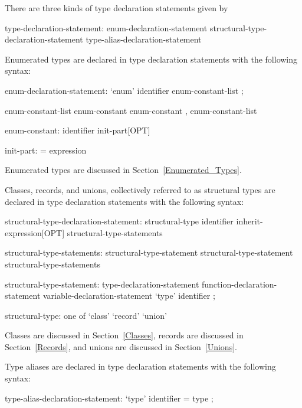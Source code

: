 There are three kinds of type declaration statements given by
\begin{syntax}
type-declaration-statement:
  enum-declaration-statement
  structural-type-declaration-statement
  type-alias-declaration-statement
\end{syntax}

Enumerated types are declared in type declaration statements with the
following syntax:
\begin{syntax}
enum-declaration-statement:
  `enum' identifier { enum-constant-list } ;

enum-constant-list
  enum-constant
  enum-constant , enum-constant-list

enum-constant:
  identifier init-part[OPT]

init-part:
  = expression
\end{syntax}
Enumerated types are discussed in Section~\ref{Enumerated_Types}.

Classes, records, and unions, collectively referred to as structural
types are declared in type declaration statements with the following
syntax:
\begin{syntax}
structural-type-declaration-statement:
  structural-type identifier inherit-expression[OPT] {
    structural-type-statements }

structural-type-statements:
  structural-type-statement
  structural-type-statement structural-type-statements

structural-type-statement:
  type-declaration-statement
  function-declaration-statement
  variable-declaration-statement
  `type' identifier ;

structural-type: one of
  `class' `record' `union'
\end{syntax}
Classes are discussed in Section~\ref{Classes}, records are discussed
in Section~\ref{Records}, and unions are discussed in
Section~\ref{Unions}.

Type aliases are declared in type declaration statements with the
following syntax:
\begin{syntax}
type-alias-declaration-statement:
  `type' identifier = type ;
\end{syntax}
